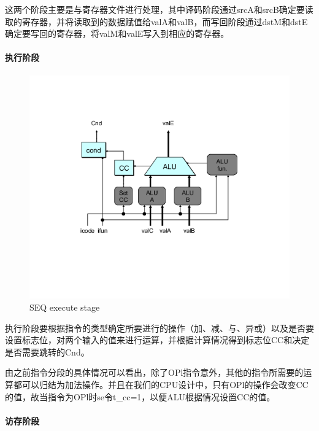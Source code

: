 这两个阶段主要是与寄存器文件进行处理，其中译码阶段通过srcA和srcB确定要读取的寄存器，并将读取到的数据赋值给valA和valB，而写回阶段通过dstM和dstE确定要写回的寄存器，将valM和valE写入到相应的寄存器。

\paragraph{执行阶段}\label{ux6267ux884cux9636ux6bb5}

\begin{figure}[htbp]
\centering
\includegraphics{img/seq-execute.png}
\caption{SEQ execute stage}
\end{figure}

执行阶段要根据指令的类型确定所要进行的操作（加、减、与、异或）以及是否要设置标志位，对两个输入的值来进行运算，并根据计算情况得到标志位CC和决定是否需要跳转的Cnd。

由之前指令分段的具体情况可以看出，除了OPl指令意外，其他的指令所需要的运算都可以归结为加法操作。并且在我们的CPU设计中，只有OPl的操作会改变CC的值，故当指令为OPl时se令t\_cc=1，以便ALU根据情况设置CC的值。

\paragraph{访存阶段}\label{ux8bbfux5b58ux9636ux6bb5}

